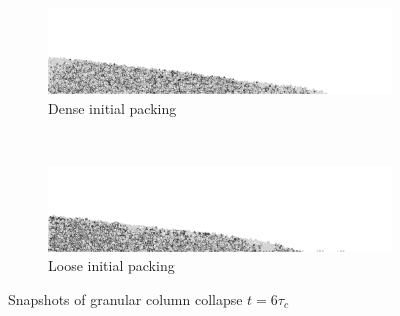 \begin{figure}[bhp]
\centering
\begin{subfigure}[b]{\textwidth}
\centering
\includegraphics[width=\textwidth]{dense_a08_r6_final}
\caption{Dense initial packing}
\label{fig:dense_a08_r6_final}
\end{subfigure}
\\
\begin{subfigure}[b]{\textwidth}
\centering
\includegraphics[width=\textwidth]{loose_a08_r6_final}
\caption{Loose initial packing}
\label{fig:loose_a08_r6_final}
\end{subfigure}
\caption{Snapshots of granular column collapse $t = 6 \tau_c$}
\label{fig:density_r6}
\end{figure}


